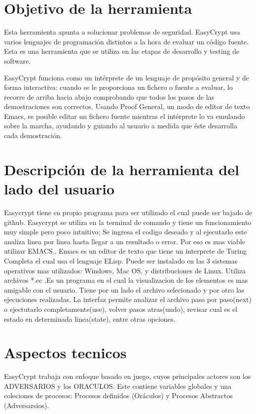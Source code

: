 \documentclass[runningheads,a4paper]{llncs}
\begin{document}
\section{Objetivo de la herramienta} 

Esta herramienta apunta a solucionar problemas de seguridad. EasyCrypt usa varios lenguajes de programación distintos a la hora de evaluar un código fuente. Esta es una herramienta que se utiliza en las etapas de desarrollo y testing de software. 

EasyCrypt funciona como un intérprete de un lenguaje de propósito general y de forma interactiva: cuando se le proporciona un fichero o fuente a evaluar, lo recorre de arriba hacia abajo comprobando que todos los pasos de las demostraciones son correctos. Usando Proof General, un modo de editor de texto Emacs, es posible editar un fichero fuente mientras el intérprete lo va emulando sobre la marcha, ayudando y guiando al usuario a medida que éste desarrolla cada demostración. 

\section{Descripción de la herramienta del lado del usuario}

Easycrypt tiene su propio programa  para ser utilizado el cual puede ser bajado de github.\cite{link1}
Easycrypt se utiliza en la terminal de comando y tiene un funcionamiento muy simple pero poco intuitivo; Se ingresa el codigo deseado y al ejecutarlo este analiza linea por linea hasta llegar a un resultado o error. Por eso es mas viable utilizar EMACS.\cite{link2}. Emacs es un editor de texto que tiene un interprete de Turing Completa el cual usa el lenguaje ELisp. Puede ser instalado en las 3 sistemas operativos mas utilizados: Windows, Mac OS, y distribuciones de Linux. Utiliza archivos *.ec  .Es un programa en el cual la visualizacion de los elementos es mas amigable con el usuario. Tiene por un lado el archivo selecionado y por otro las ejecuciones realizadas. La interfaz permite analizar el archivo paso por paso(next) o ejectutarlo completamente(use), volver pasos atras(undo), revisar cual es el estado en determinada linea(state), entre otras opciones.


\section{Aspectos tecnicos}
EasyCrypt trabaja con enfoque basado en juego, cuyos principales actores son los ADVERSARIOS y los ORACULOS. Este contiene variables globales y una coleciones de procesos: Procesos definidos (Oráculos) y Procesos Abstractos (Adversarsios).
\end{document}

